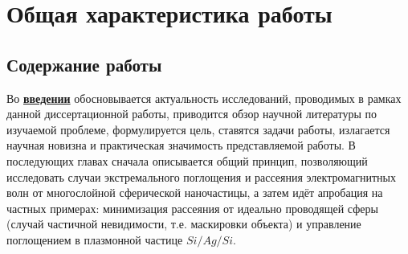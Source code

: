 \section*{Общая характеристика работы}

\newcommand{\actuality}{\underline{\textbf{\actualityTXT}}}
\newcommand{\progress}{\underline{\textbf{\progressTXT}}}
\newcommand{\aim}{\underline{{\textbf\aimTXT}}}
\newcommand{\tasks}{\underline{\textbf{\tasksTXT}}}
\newcommand{\novelty}{\underline{\textbf{\noveltyTXT}}}
\newcommand{\influence}{\underline{\textbf{\influenceTXT}}}
\newcommand{\methods}{\underline{\textbf{\methodsTXT}}}
\newcommand{\defpositions}{\underline{\textbf{\defpositionsTXT}}}
\newcommand{\reliability}{\underline{\textbf{\reliabilityTXT}}}
\newcommand{\probation}{\underline{\textbf{\probationTXT}}}
\newcommand{\contribution}{\underline{\textbf{\contributionTXT}}}
\newcommand{\publications}{\underline{\textbf{\publicationsTXT}}}




\subsection*{Содержание работы}
Во \underline{\textbf{введении}} обосновывается актуальность
исследований, проводимых в рамках данной диссертационной работы,
приводится обзор научной литературы по изучаемой проблеме,
формулируется цель, ставятся задачи работы, излагается научная
новизна и практическая значимость представляемой работы. В последующих
главах сначала описывается общий принцип, позволяющий исследовать
случаи экстремального поглощения и рассеяния электромагнитных волн от
многослойной сферической наночастицы, а затем идёт апробация на
частных примерах: минимизация рассеяния от идеально проводящей сферы
(случай частичной невидимости, т.е. маскировки объекта) и управление
поглощением в плазмонной частице $Si/Ag/Si$.


